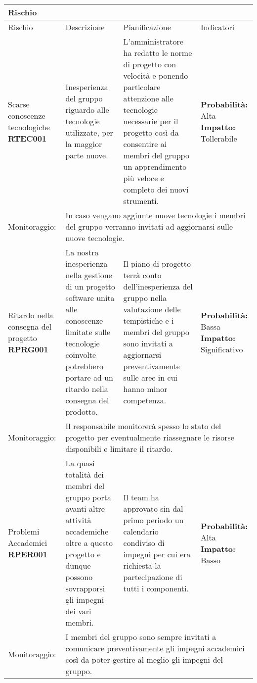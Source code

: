 \documentclass[../piano-di-progetto.tex]{subfiles}
\begin{document}
      \begin{longtable}[H]{|p{10em}|p{13em}|p{13em}|p{10em}|}
      \rowcolor{darkgray!90!}
      \color{white}
      {\textbf{Rischio}} & \color{white}{\textbf{Descrizione}} & \color{white}{\textbf{Pianificazione}} & \color{white}{\textbf{Indicatori}} \\
      \endhead{}
      Rischio & Descrizione & Pianificazione & Indicatori\\
      \hline %
  \endhead{}
  Scarse conoscenze tecnologiche \textbf{RTEC001} & Inesperienza del gruppo riguardo alle tecnologie utilizzate, per la maggior parte nuove. & L'amministratore ha redatto le norme di progetto con velocità e ponendo particolare attenzione alle tecnologie necessarie per il progetto così da consentire ai membri del gruppo un apprendimento più veloce e completo dei nuovi strumenti. & \textbf{Probabilità:} Alta \textbf{Impatto:} Tollerabile \\
  Monitoraggio: & \multicolumn{3}{p{38.5em}|}{In caso vengano aggiunte nuove tecnologie i membri del gruppo verranno invitati ad aggiornarsi sulle nuove tecnologie.}\\
  \hline %
  Ritardo nella consegna del progetto \textbf{RPRG001} & La nostra inesperienza nella gestione di un progetto software unita alle conoscenze limitate sulle tecnologie coinvolte potrebbero portare ad un ritardo nella consegna del prodotto. & Il piano di progetto terrà conto dell'inesperienza del gruppo nella valutazione delle tempistiche e i membri del gruppo sono invitati a aggiornarsi preventivamente sulle aree in cui hanno minor competenza. & \textbf{Probabilità:}   Bassa \textbf{Impatto: }  Significativo  \\
  Monitoraggio: & \multicolumn{3}{p{38.5em}|}{Il responsabile monitorerà spesso lo stato del progetto per eventualmente riassegnare le risorse disponibili e limitare il ritardo.}\\
  \hline %
  Problemi Accademici \textbf{RPER001} & La quasi totalità dei membri del gruppo porta avanti altre attività accademiche oltre a questo progetto e dunque possono sovrapporsi gli impegni dei vari membri. & Il team ha approvato sin dal primo periodo un calendario condiviso di impegni per cui era richiesta la partecipazione di tutti i componenti. & \textbf{Probabilità: }   Alta \textbf{Impatto: }    Basso\\
  Monitoraggio: & \multicolumn{3}{p{38.5em}|}{I membri del gruppo sono sempre invitati a comunicare preventivamente gli impegni accademici così da poter gestire al meglio gli impegni del gruppo.}\\

\end{longtable}
\end{document}
